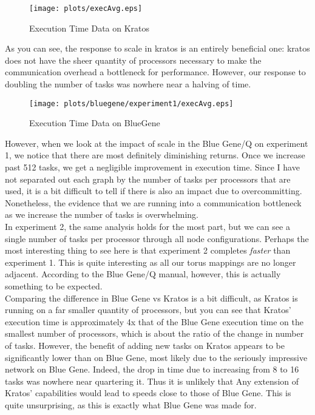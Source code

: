 \documentclass[twocolumn]{article}
\begin{document}
\begin{figure}
  \centering
  \texttt{[image: plots/execAvg.eps]}
  \caption{Execution Time Data on Kratos}
\end{figure}

As you can see, the response to scale in kratos is an entirely beneficial one: 
kratos does not have the sheer quantity of processors necessary to make the 
communication overhead a bottleneck for performance. However, our response to 
doubling the number of tasks was nowhere near a halving of time. \\

\begin{figure}
  \centering
  \texttt{[image: plots/bluegene/experiment1/execAvg.eps]}
  \caption{Execution Time Data on BlueGene}
\end{figure}

However, when we look at the impact of scale in the Blue Gene/Q on experiment 1, 
we notice that there are most definitely diminishing returns. Once we increase 
past 512 tasks, we get a negligible improvement in execution time. Since I have 
not separated out each graph by the number of tasks per processors that are used,
it is a bit difficult to tell if there is also an impact due to overcommitting.
Nonetheless, the evidence that we are running into a communication bottleneck as
we increase the number of tasks is overwhelming. \\

In experiment 2, the same analysis holds for the most part, but we can see a single
number of tasks per processor through all node configurations. Perhaps the most 
interesting thing to see here is that experiment 2 completes \emph{faster} than
experiment 1. This is quite interesting as all our torus mappings are no longer
adjacent. According to the Blue Gene/Q manual, however, this is actually something
to be expected. \\

Comparing the difference in Blue Gene vs Kratos is a bit difficult, as Kratos is 
running on a far smaller quantity of processors, but you can see that Kratos' 
execution time is approximately 4x that of the Blue Gene execution time on the
smallest number of processors, which is about the ratio of the change in number 
of tasks. However, the benefit of adding new tasks on Kratos appears to be
significantly lower than on Blue Gene, most likely due to the seriously impressive
network on Blue Gene. Indeed, the drop in time due to increasing from 8 to 16
tasks was nowhere near quartering it. Thus it is unlikely that Any extension of 
Kratos' capabilities would lead to speeds close to those of Blue Gene. This is
quite unsurprising, as this is exactly what Blue Gene was made for. \\
\end{document}

